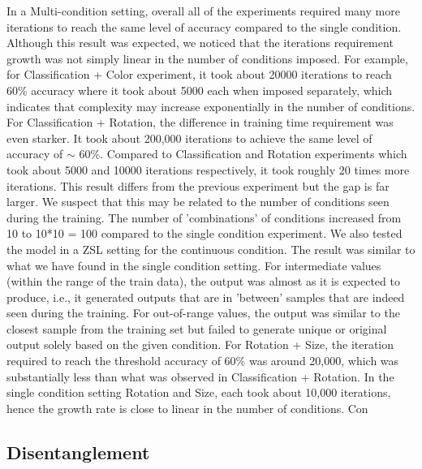 \documentclass[11pt, letterpaper, oneside]{article}
\begin{document}
In a Multi-condition setting, overall all of the experiments required many more iterations to reach the same level of accuracy compared to the single condition. Although this result was expected, we noticed that the iterations requirement growth was not simply linear in the number of conditions imposed. For example, for Classification + Color experiment, it took about 20000 iterations to reach 60\% accuracy where it took about 5000 each when imposed separately, which indicates that complexity may increase exponentially in the number of conditions. 
For Classification + Rotation, the difference in training time requirement was even starker. It took about 200,000 iterations to achieve the same level of accuracy of $\sim$ 60\%. Compared to Classification and Rotation experiments which took about 5000 and 10000 iterations respectively, it took roughly 20 times more iterations. This result differs from the previous experiment but the gap is far larger.  We suspect that this may be related to the number of conditions seen during the training. The number of 'combinations' of conditions increased from 10 to 10*10 = 100 compared to the single condition experiment. We also tested the model in a ZSL setting for the continuous condition. The result was similar to what we have found in the single condition setting. For intermediate values (within the range of the train data), the output was almost as it is expected to produce, i.e., it generated outputs that are in 'between' samples that are indeed seen during the training. For out-of-range values, the output was similar to the closest sample from the training set but failed to generate unique or original output solely based on the given condition. 
For Rotation + Size, the iteration required to reach the threshold accuracy of 60\% was around 20,000, which was substantially less than what was observed in Classification + Rotation. In the single condition setting Rotation and Size, each took about 10,000 iterations, hence the growth rate is close to linear in the number of conditions. Con

\subsection{Disentanglement}
    
    
\end{document}
